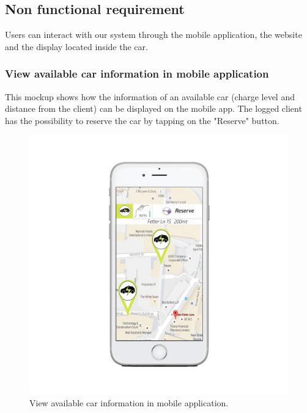 \subsection{Non functional requirement}
Users can interact with our system through the mobile application, the website and the display located inside the car.

\subsubsection{View available car information in mobile application} This mockup shows how the information of an available car (charge level and distance from the client) can be displayed on the mobile app. The logged client has the possibility to reserve the car by tapping on the "Reserve" button.
\begin{figure}[h]
\centering
\includegraphics[width=400 pt]{resources/editato.jpg}
\caption{\label{fig:editato}View available car information in mobile application.}
\end{figure}

